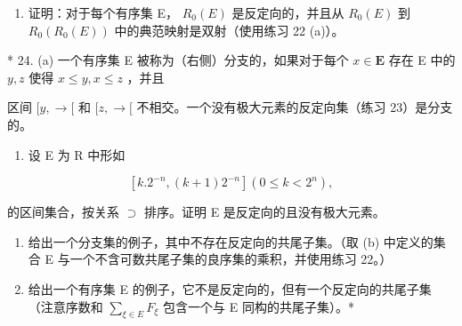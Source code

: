 \begin{enumerate}
\def\labelenumi{(\alph{enumi})}
\setcounter{enumi}{2}
\tightlist
\item
  证明：对于每个有序集 E， \(R_{0}(E)\) 是反定向的，并且从 \(R_{0}(E)\) 到 \(R_{0}(R_{0}(E))\) 中的典范映射是双射（使用练习 22 (a)）。
\end{enumerate}

* 24. (a) 一个有序集 E 被称为（右侧）分支的，如果对于每个 \(x \in \mathbf{E}\) 存在 E 中的 \(y, z\) 使得 \(x \leqslant y, x \leqslant z\) ，并且

区间 \([y, \rightarrow[\) 和 \([z, \rightarrow[\) 不相交。一个没有极大元素的反定向集（练习 23）是分支的。

\begin{enumerate}
\def\labelenumi{(\alph{enumi})}
\setcounter{enumi}{1}
\tightlist
\item
  设 E 为 R 中形如
\end{enumerate}

\[
[ k. 2 ^ {- n}, (k + 1) 2 ^ {- n} ] (0 \leqslant k <   2 ^ {n}),
\]

的区间集合，按关系 \(\supset\) 排序。证明 E 是反定向的且没有极大元素。

\begin{enumerate}
\def\labelenumi{(\alph{enumi})}
\setcounter{enumi}{2}
\item
  给出一个分支集的例子，其中不存在反定向的共尾子集。（取 (b) 中定义的集合 E 与一个不含可数共尾子集的良序集的乘积，并使用练习 22。）
\item
  给出一个有序集 E 的例子，它不是反定向的，但有一个反定向的共尾子集（注意序数和 \(\sum_{\xi\in E} F_{\xi}\) 包含一个与 E 同构的共尾子集）。*
\end{enumerate}

